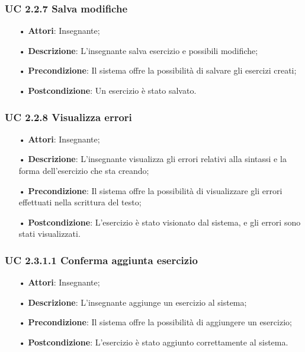 \subsubsection{UC 2.2.7	Salva modifiche}
\begin{itemize}
	\item[•] \textbf{Attori}: Insegnante;
	\item[•] \textbf{Descrizione}: L'insegnante salva esercizio e possibili modifiche;
	\item[•] \textbf{Precondizione}: Il sistema offre la possibilità di salvare gli esercizi creati;
	\item[•] \textbf{Postcondizione}: Un esercizio è stato salvato.
\end{itemize}

\subsubsection{UC 2.2.8 Visualizza errori}
\begin{itemize}
	\item[•] \textbf{Attori}: Insegnante;
	\item[•] \textbf{Descrizione}: L'insegnante visualizza gli errori relativi alla sintassi e la forma dell’esercizio che sta creando;
	\item[•] \textbf{Precondizione}: Il sistema offre la possibilità di visualizzare gli errori effettuati nella scrittura del testo;
	\item[•] \textbf{Postcondizione}: L’esercizio è stato visionato dal sistema, e gli errori sono stati visualizzati.
\end{itemize}

\subsubsection{UC 2.3.1.1 Conferma aggiunta esercizio}
\begin{itemize}
	\item[•] \textbf{Attori}: Insegnante;
	\item[•] \textbf{Descrizione}: L'insegnante aggiunge un esercizio al sistema;
	\item[•] \textbf{Precondizione}: Il sistema offre la possibilità di aggiungere un esercizio;
	\item[•] \textbf{Postcondizione}: L’esercizio è stato aggiunto correttamente al sistema.
\end{itemize}


